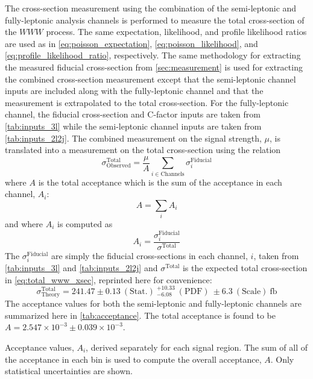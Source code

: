 The cross-section measurement using the combination of the semi-leptonic
and fully-leptonic analysis channels is performed to 
measure the total cross-section of the $WWW$ process. 
The same expectation, likelihood, and profile likelihood
ratios are used as in \eqn\eqref{eq:poisson_expectation},
\eqn\eqref{eq:poisson_likelihood}, and
\eqn\eqref{eq:profile_likelihood_ratio}, respectively.
The same methodology for extracting the measured fiducial
cross-section from
\sec\ref{sec:measurement} is used for extracting the combined
cross-section measurement except that the semi-leptonic channel
inputs are included along with the fully-leptonic channel
and that the measurement is extrapolated to the total
cross-section.
For the fully-leptonic channel,
the fiducial cross-section and C-factor inputs 
are taken from \tab\ref{tab:inputs_3l}
while the semi-leptonic channel inputs are taken from 
\tab\ref{tab:inputs_2l2j}.
The combined measurement on the signal strength, $\mu$, is translated
into a measurement on the total cross-section using the relation
\begin{equation}
\sigma^{\textrm{Total}}_{\textrm{Observed}} = \frac{\mu}{A} \sum_{i\in \textrm{Channels}} \sigma^{\textrm{Fiducial}}_i
\label{eq:sigmatot}
\end{equation}
where $A$ is the total acceptance which is the sum of the 
acceptance in each channel, $A_i$:
\begin{equation}
A = \sum_i A_i
\end{equation}
and where $A_i$ is computed as
\begin{equation}
A_i = \frac{ \sigma^{\textrm{Fiducial}}_i }{ \sigma^{\textrm{Total}}}
\end{equation}
The $\sigma^{\textrm{Fiducial}}_i $ are simply the fiducial
cross-sections in each channel, $i$,  taken from
\tab\ref{tab:inputs_3l} and \tab\ref{tab:inputs_2l2j}
and $\sigma^{\textrm{Total}}$ is the expected total cross-section
in \eqn\eqref{eq:total_www_xsec}, reprinted here for convenience:
\begin{equation}
\sigma^{\textrm{Total}}_{\textrm{Theory}}= 241.47\pm0.13 ~(\textrm{Stat.}) ~^{+10.33}_{-6.08} ~(\textrm{PDF}) ~\pm 6.3 ~(\textrm{Scale}) ~\textrm{fb} %
\end{equation}
The acceptance values for both the semi-leptonic and fully-leptonic channels 
are summarized here in \tab\ref{tab:acceptance}.
The total acceptance is found to be $A = 2.547 \times 10^{-3} \pm 0.039 \times 10^{-3}$.


\begin{table}[ht!]
\centering

\caption{Acceptance values, $A_i$, derived separately for each signal region. 
The sum of all of the acceptance
in each bin is used to compute the overall acceptance, $A$. 
Only statistical uncertainties are shown.}
\label{tab:acceptance}
\end{table}


